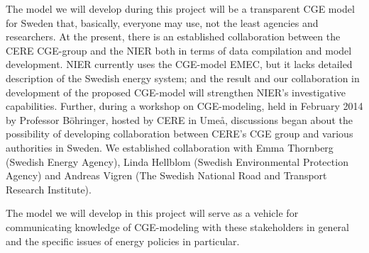 The model we will develop during this project will be a transparent CGE model for Sweden that, basically, everyone may use,  not the least agencies and researchers. At the present, there is an established collaboration between the CERE CGE-group and the NIER both in terms of data compilation and model development. NIER currently uses the CGE-model EMEC, but it lacks detailed description of the Swedish energy system; and the result and our collaboration in development of the proposed CGE-model will strengthen NIER's investigative capabilities. Further, during a workshop on CGE-modeling, held in February 2014 by Professor Böhringer, hosted by CERE in Umeå, discussions began about the possibility of developing collaboration between CERE's CGE group and various authorities in Sweden. We established collaboration with Emma Thornberg (Swedish Energy Agency), Linda Hellblom (Swedish Environmental Protection Agency) and Andreas Vigren (The Swedish National Road and Transport Research Institute).

The model we will develop in this project will serve as a vehicle for communicating knowledge of CGE-modeling with these stakeholders in general and the specific issues of energy policies in particular.


